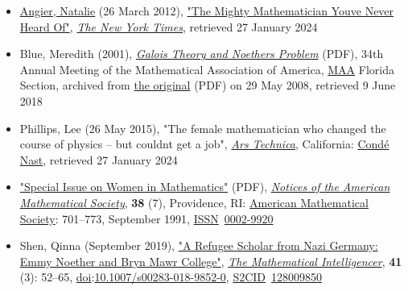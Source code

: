 \begin{itemize}
\tightlist
\item
  {\href{https://en.wikipedia.org/wiki/Natalie_Angier}{Angier, Natalie} (26 March 2012), \href{https://www.nytimes.com/2012/03/27/science/emmy-noether-the-most-significant-mathematician-youve-never-heard-of.html}{"The Mighty Mathematician You\textquotesingle ve Never Heard Of"}, \emph{\href{https://en.wikipedia.org/wiki/The_New_York_Times}{The New York Times}}{, retrieved {27 January} 2024}{}}
\item
  {Blue, Meredith (2001), \href{https://web.archive.org/web/20080529020714/http://mcc1.mccfl.edu/fl_maa/proceedings/2001/blue.pdf}{\emph{Galois Theory and Noether\textquotesingle s Problem}} {(PDF)}, 34th Annual Meeting of the Mathematical Association of America, \href{https://en.wikipedia.org/wiki/Mathematical_Association_of_America}{MAA} Florida Section, archived from \href{http://mcc1.mccfl.edu/fl_maa/proceedings/2001/blue.pdf}{the original} {(PDF)} on 29 May 2008{, retrieved {9 June} 2018}{}}
\item
  {Phillips, Lee (26 May 2015), "The female mathematician who changed the course of physics -- but couldn\textquotesingle t get a job", \emph{\href{https://en.wikipedia.org/wiki/Ars_Technica}{Ars Technica}}, California: \href{https://en.wikipedia.org/wiki/Condé_Nast}{Condé Nast}{, retrieved {27 January} 2024}{}}
\item
  {\href{https://www.ams.org/journals/notices/199109/199109FullIssue.pdf}{"Special Issue on Women in Mathematics"} {(PDF)}, \emph{\href{https://en.wikipedia.org/wiki/Notices_of_the_American_Mathematical_Society}{Notices of the American Mathematical Society}}, \textbf{38} (7), Providence, RI: \href{https://en.wikipedia.org/wiki/American_Mathematical_Society}{American Mathematical Society}: {701--}773, September 1991, \href{https://en.wikipedia.org/wiki/ISSN_(identifier)}{ISSN}{~}\href{https://search.worldcat.org/issn/0002-9920}{0002-9920}{}}
\item
  {Shen, Qinna (September 2019), \href{https://repository.brynmawr.edu/german_pubs/19/}{"A Refugee Scholar from Nazi Germany: Emmy Noether and Bryn Mawr College"}, \emph{\href{https://en.wikipedia.org/wiki/The_Mathematical_Intelligencer}{The Mathematical Intelligencer}}, \textbf{41} (3): {52--}65, \href{https://en.wikipedia.org/wiki/Doi_(identifier)}{doi}:\href{https://doi.org/10.1007\%2Fs00283-018-9852-0}{10.1007/s00283-018-9852-0}, \href{https://en.wikipedia.org/wiki/S2CID_(identifier)}{S2CID}{~}\href{https://api.semanticscholar.org/CorpusID:128009850}{128009850}{}}
\end{itemize}



